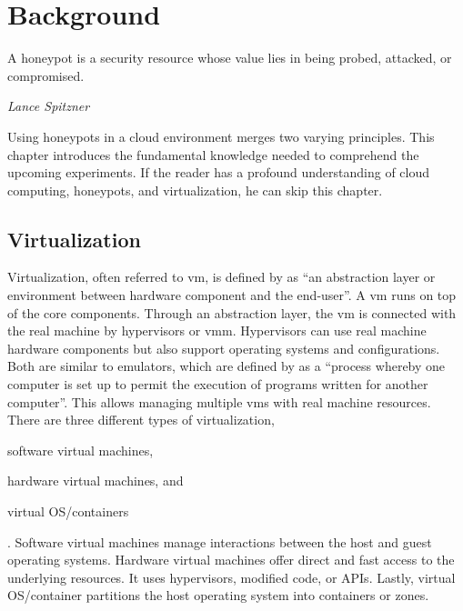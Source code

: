\chapter{Background}
\label{chap:background}

\epigraph{A honeypot is a security resource whose value lies in being probed, attacked, or compromised.}{\textit{Lance Spitzner}}

Using honeypots in a cloud environment merges two varying principles.
This chapter introduces the fundamental knowledge needed to comprehend the upcoming experiments.
If the reader has a profound understanding of cloud computing, honeypots, and virtualization, he can skip this chapter.

\section{Virtualization}

Virtualization, often referred to \ac{vm}, is defined by \citet{kreuter2004} as \enquote{an abstraction layer or environment between hardware component and the end-user}.
A \ac{vm} runs on top of the  core components.
Through an abstraction layer, the \acl{vm} is connected with the real machine by hypervisors or \ac{vmm}.
Hypervisors can use real machine hardware components but also support  operating systems and configurations.
Both are similar to emulators, which are defined by \citet{lichstei1969} as a \enquote{process whereby one computer is set up to permit the execution of programs written for another computer}.
This allows managing multiple \acp{vm} with real machine resources.
There are three different types of virtualization,
\begin{enumerate*}[label=(\roman*)]
    \item software virtual machines,
    \item hardware virtual machines, and
    \item virtual OS/containers
\end{enumerate*}.
Software virtual machines manage interactions between the host and guest operating systems.
Hardware virtual machines offer direct and fast access to the underlying resources.
It uses hypervisors, modified code, or APIs.
Lastly, virtual OS/container partitions the host operating system into containers or zones.
\cite{daniels2009}

